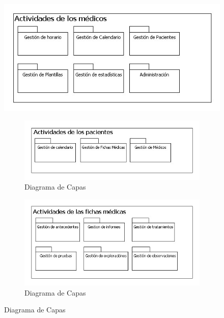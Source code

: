 	\begin{figure}[H]
	  \centering
	    \includegraphics[width=13cm]{img/jpg/acapas/Actividades_medicos.jpg}
	  \caption{Diagrama de Capas}
	  \label{fig:acapas_medicos}
	
	\begin{figure}[H]
	  \centering
	    \includegraphics[width=13cm]{img/jpg/acapas/Actividades_Pacientes.jpg}
	  \caption{Diagrama de Capas}
	  \label{fig:acapas_pacientes}
	\end{figure}
	
	\begin{figure}[H]
	  \centering
	    \includegraphics[width=13cm]{img/jpg/acapas/fichas_medicas.jpg}
	  \caption{Diagrama de Capas}
	  \label{fig:acapas_fichas}
	\end{figure}
	\end{figure}

